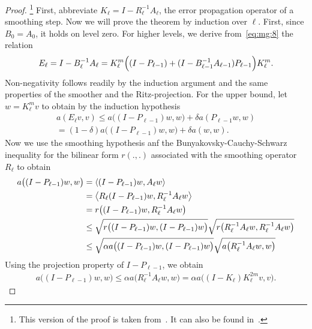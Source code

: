 \begin{proof}
  \footnote{This version of the proof is taken
    from~\cite{ArnoldFalkWinther97Hdiv}. It can also be found
    in~\cite{BraessHackbusch83,Bramble93}.}
  First, abbreviate $K_{\ell} = I-R_{\ell}^{-1} A_\ell$, the error
  propagation operator of a smoothing step. Now we will prove the
  theorem by induction over $\ell$. First, since $B_0 = A_0$, it holds
  on level zero. For higher levels, we derive from~\eqref{eq:mg:8} the
  relation
  \begin{gather}
    \label{eq:mg:13}
    E_\ell = I-B_\ell^{-1} A_\ell = K_\ell^m\Bigl(
    (I-P_{\ell-1}) + (I-B_{\ell-1}^{-1} A_{\ell-1}) P_{\ell-1}
    \Bigr) K_\ell^m.
  \end{gather}
  Non-negativity follows readily by the induction argument and
  the same properties of the smoother and the Ritz-projection. For the
  upper bound, let $w = K_\ell^m v$ to obtain by the induction
  hypothesis
  \begin{multline}
    \label{eq:mg:14}
    a(E_\ell v,v) \le a\bigl((I-P_{\ell-1}) w,w\bigr) + \delta
    a(P_{\ell-1}w,w)
    \\
    = (1-\delta) a\bigl((I-P_{\ell-1}) w,w\bigr)
   + \delta a(w,w).
  \end{multline}
  Now we use the smoothing hypothesis anf the
  Bunyakovsky-Cauchy-Schwarz inequality for the bilinear form $r(.,.)$
  associated with the smoothing operator $R_\ell$ to obtain
  \begin{align*}
    a\bigl((I-P_{\ell-1}) w,w\bigr)
    &= \scal({(I-P_{\ell-1}) w}, A_\ell w) \\
    &= \scal(R_\ell {(I-P_{\ell-1})} w, R_\ell^{-1} A_\ell w)
    \\
    &= r\bigl((I-P_{\ell-1}) w, R_\ell^{-1} A_\ell w\bigr) \\
    &\le \sqrt{r\bigl((I-P_{\ell-1}) w,(I-P_{\ell-1}) w\bigr)}
    \sqrt{r\bigl(R_\ell^{-1} A_\ell w, R_\ell^{-1} A_\ell w\bigr)}
    \\
    &\le \sqrt{\alpha a\bigl((I-P_{\ell-1}) w,(I-P_{\ell-1}) w\bigr)}
    \sqrt{a\bigl(R_\ell^{-1} A_\ell w, w\bigr)}
  \end{align*}
  Using the projection property of $I-P_{\ell-1}$, we obtain
  \begin{gather}
    \label{eq:mg:15}
    a\bigl((I-P_{\ell-1}) w,w\bigr) \le \alpha a\bigl(R_\ell^{-1} A_\ell
    w, w\bigr)
    = \alpha a\bigl((I-K_\ell) K_\ell^{2m} v,v\bigr).
  \end{gather}
  

\end{proof}

